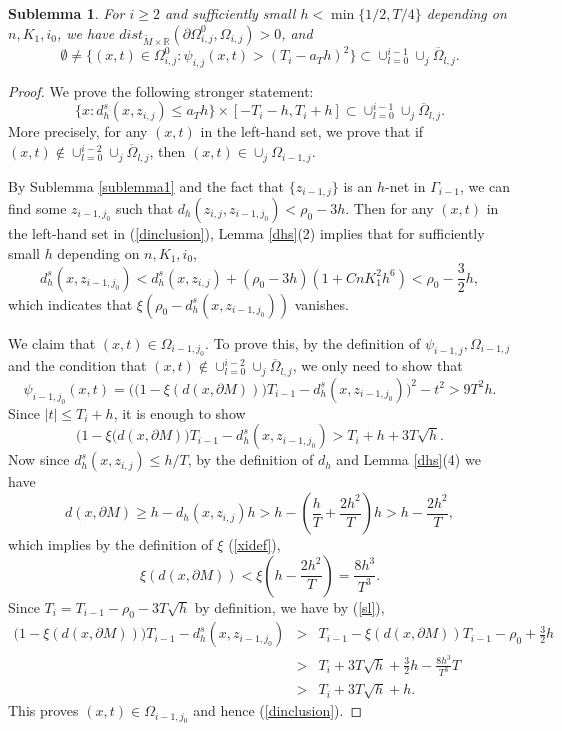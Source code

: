 \documentclass[11pt,letterpaper]{amsart}
\numberwithin{equation}{section}
\theoremstyle{definition}
\theoremstyle{plain}
\theoremstyle{definition}
\theoremstyle{plain}
\newtheorem{sublemma2}[sublemmainitial]{Sublemma}
\theoremstyle{definition}
\theoremstyle{plain}
\begin{document}
\begin{sublemma2}\label{sublemma2}
For $i\geqslant 2$ and sufficiently small $h<\min\{1/2,T/4\}$ depending on $n,K_1,i_0$, we have $dist_{\widetilde{M}\times \mathbb{R}} (\partial \Omega^{0}_{i,j},\Omega_{i,j})>0$, and
$$\emptyset\neq \big\{(x,t)\in \Omega^{0}_{i,j}: \psi_{i,j}(x,t)>(T_i-a_T h)^2 \big\}\subset \cup_{l=0}^{i-1}\cup_j\overline{\Omega}_{l,j}.$$

\end{sublemma2}
\begin{proof}
We prove the following stronger statement:
\begin{equation}\label{dinclusion}
\{x: d_h^s(x,z_{i,j}) \leqslant a_T h\}\times [-T_i-h,T_i+h] \subset \cup_{l=0}^{i-1}\cup_j\overline{\Omega}_{l,j}.
\end{equation}
More precisely, for any $(x,t)$ in the left-hand set, we prove that if $(x,t)\notin \cup_{l=0}^{i-2}\cup_j\overline{\Omega}_{l,j}$, then $(x,t)\in \cup_j \Omega_{i-1,j}$.

By Sublemma \ref{sublemma1} and the fact that $\{z_{i-1,j}\}$ is an $h$-net in $\Gamma_{i-1}$, we can find some $z_{i-1,j_0}$ such that $d_h(z_{i,j},z_{i-1,j_0})<\rho_0-3h$. Then for any $(x,t)$ in the left-hand set in (\ref{dinclusion}), Lemma \ref{dhs}(2) implies that for sufficiently small $h$ depending on $n,K_1,i_0$,
\begin{equation}\label{sl}
d_h^s(x,z_{i-1,j_0}) < d_h^s(x,z_{i,j})+(\rho_0-3h)(1+CnK_1^2 h^6) < \rho_0-\frac{3}{2}h,
\end{equation}
which indicates that $\xi(\rho_0-d_h^s(x,z_{i-1,j_0}))$ vanishes.

We claim that $(x,t)\in \Omega_{i-1,j_0}$. To prove this, by the definition of $\psi_{i-1,j},\Omega_{i-1,j}$ and the condition that $(x,t)\notin \cup_{l=0}^{i-2}\cup_j\overline{\Omega}_{l,j}$, we only need to show that
$$\psi_{i-1,j_0}(x,t)=\Big( \big(1-\xi(d(x,\partial M))\big)T_{i-1}-d_h^s(x,z_{i-1,j_0})\Big)^2-t^2 > 9T^2 h.$$
Since $|t|\leqslant T_i+h$, it is enough to show
$$\big(1-\xi(d(x,\partial M)\big)T_{i-1}-d_h^s(x,z_{i-1,j_0}) > T_{i}+h+3T\sqrt{h}.$$
Now since $d_h^s(x,z_{i,j})\leqslant h/T$, by the definition of $d_h$ and Lemma \ref{dhs}(4) we have
$$d(x,\partial M)\geqslant h-d_h(x,z_{i,j})h> h-(\frac{h}{T}+\frac{2h^2}{T})h>h-\frac{2h^2}{T},$$
which implies by the definition of $\xi$ (\ref{xidef}),
$$\xi(d(x,\partial M))< \xi(h-\frac{2h^2}{T}) = \frac{8 h^3}{T^3}.$$
Since $T_i=T_{i-1}-\rho_0-3T\sqrt{h}$ by definition, we have by (\ref{sl}),
\begin{eqnarray*}
\big(1-\xi(d(x,\partial M))\big)T_{i-1}-d_h^s(x,z_{i-1,j_0}) &>& T_{i-1}-\xi(d(x,\partial M)) T_{i-1}-\rho_0+\frac{3}{2}h \\
&>& T_i+3T\sqrt{h}+\frac{3}{2}h-\frac{8 h^3}{T^3}T \\
&>& T_i+3T\sqrt{h}+h.
\end{eqnarray*}
This proves $(x,t)\in \Omega_{i-1,j_0}$ and hence (\ref{dinclusion}). 


\end{proof}
\end{document}
